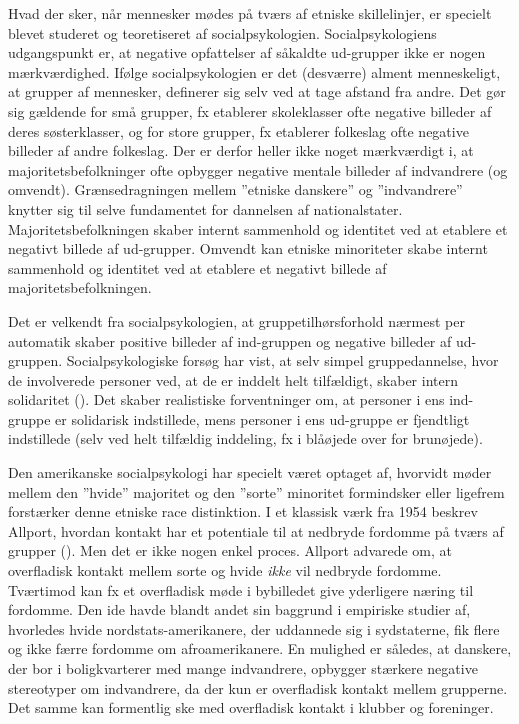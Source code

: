 \documentclass[
]{book}
\begin{document}
Hvad der sker, når mennesker mødes på tværs af etniske skillelinjer, er specielt blevet studeret og teoretiseret af socialpsykologien. Socialpsykologiens udgangspunkt er, at negative opfattelser af såkaldte ud-grupper ikke er nogen mærkværdighed. Ifølge socialpsykologien er det (desværre) alment menneskeligt, at grupper af mennesker, definerer sig selv ved at tage afstand fra andre. Det gør sig gældende for små grupper, fx etablerer skoleklasser ofte negative billeder af deres søsterklasser, og for store grupper, fx etablerer folkeslag ofte negative billeder af andre folkeslag. Der er derfor heller ikke noget mærkværdigt i, at majoritetsbefolkninger ofte opbygger negative mentale billeder af indvandrere (og omvendt). Grænsedragningen mellem ''etniske danskere'' og ''indvandrere'' knytter sig til selve fundamentet for dannelsen af nationalstater. Majoritetsbefolkningen skaber internt sammenhold og identitet ved at etablere et negativt billede af ud-grupper. Omvendt kan etniske minoriteter skabe internt sammenhold og identitet ved at etablere et negativt billede af majoritetsbefolkningen.

Det er velkendt fra socialpsykologien, at gruppetilhørsforhold nærmest per automatik skaber positive billeder af ind-gruppen og negative billeder af ud-gruppen. Socialpsykologiske forsøg har vist, at selv simpel gruppedannelse, hvor de involverede personer ved, at de er inddelt helt tilfældigt, skaber intern solidaritet (). Det skaber realistiske forventninger om, at personer i ens ind-gruppe er solidarisk indstillede, mens personer i ens ud-gruppe er fjendtligt indstillede (selv ved helt tilfældig inddeling, fx i blåøjede over for brunøjede).

Den amerikanske socialpsykologi har specielt været optaget af, hvorvidt møder mellem den ''hvide'' majoritet og den ''sorte'' minoritet formindsker eller ligefrem forstærker denne etniske race distinktion. I et klassisk værk fra 1954 beskrev Allport, hvordan kontakt har et potentiale til at nedbryde fordomme på tværs af grupper (). Men det er ikke nogen enkel proces. Allport advarede om, at overfladisk kontakt mellem sorte og hvide \emph{ikke} vil nedbryde fordomme. Tværtimod kan fx et overfladisk møde i bybilledet give yderligere næring til fordomme. Den ide havde blandt andet sin baggrund i empiriske studier af, hvorledes hvide nordstats-amerikanere, der uddannede sig i sydstaterne, fik flere og ikke færre fordomme om afroamerikanere. En mulighed er således, at danskere, der bor i boligkvarterer med mange indvandrere, opbygger stærkere negative stereotyper om indvandrere, da der kun er overfladisk kontakt mellem grupperne. Det samme kan formentlig ske med overfladisk kontakt i klubber og foreninger.
\end{document}
